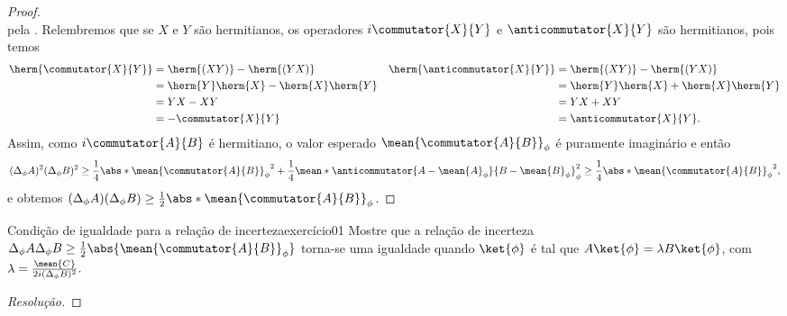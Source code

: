 \begin{proof}
\begin{equation*}
    \end{equation*}
    pela . Relembremos que se \(X\) e \(Y\) são hermitianos, os operadores \(i\commutator{X}{Y}\) e \(\anticommutator{X}{Y}\) são hermitianos, pois temos
    \begin{align*}
        \herm{\commutator{X}{Y}} &= \herm{(XY)} - \herm{(YX)}&
        \herm{\anticommutator{X}{Y}} &= \herm{(XY)} - \herm{(YX)}\\
                                     &= \herm{Y} \herm{X} - \herm{X} \herm{Y}&
                                 &= \herm{Y} \herm{X} + \herm{X} \herm{Y}\\
                                 &= YX - XY&
                                 &= YX + XY\\
                                 &= -\commutator{X}{Y}&
                                 &= \anticommutator{X}{Y}.
    \end{align*}
    Assim, como \(i \commutator{A}{B}\) é hermitiano, o valor esperado \(\mean{\commutator{A}{B}}_\phi\) é puramente imaginário e então
    \begin{equation*}
        (\Delta_\phi A)^2 (\Delta_\phi B)^2 \geq \frac14 \abs*{\mean{\commutator{A}{B}}_\phi}^2 + \frac14 \mean*{\anticommutator{A - \mean{A}_\phi}{B - \mean{B}_\phi}}_\phi^2 \geq \frac14 \abs*{\mean{\commutator{A}{B}}_\phi}^2,
    \end{equation*}
    e obtemos \((\Delta_\phi A) (\Delta_\phi B) \geq \frac12 \abs*{\mean{\commutator{A}{B}}_\phi}\).
\end{proof}
\begin{exercício}{Condição de igualdade para a relação de incerteza}{exercício01}
    Mostre que a relação de incerteza \(\Delta_\phi A \Delta_\phi B \geq \frac12\abs{\mean{\commutator{A}{B}}_\phi}\) torna-se uma igualdade quando \(\ket{\phi}\) é tal que \(A\ket{\phi} = \lambda B \ket{\phi}\), com \(\lambda = \frac{\mean{C}}{2i (\Delta_\phi B)^2}.\)
\end{exercício}
\begin{proof}[Resolução]
    
\end{proof}
